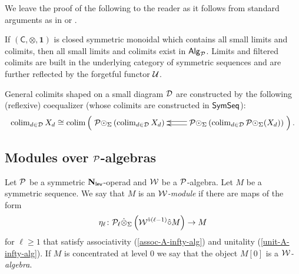 We leave the proof of the following to the reader as it follows from standard arguments as in \cite[3.29]{Har-1} or \cite[4.3]{Bor}.

\begin{proposition} If $(\mathsf{C},\otimes,\mathbf{1})$ is closed symmetric monoidal which contains all small limits and colimits, then all small limits and colimits exist in ${\mathsf{Alg}_{\mathcal{P}}}$. Limits and filtered colimits are built in the underlying category of symmetric sequences and are further reflected by the forgetful functor $\mathcal{U}$.

General colimits shaped on a small diagram $\mathcal{D}$ are constructed by the following (reflexive) coequalizer (whose colimits are constructed in $\mathsf{SymSeq}$): \[ \colim_{d\in\Cal{D}} X_d\cong \colim\left( \xymatrix{
     \Cal{P}\circdot_{\Sigma} \left( \colim_{d\in\Cal{D}} X_d \right) &
     \Cal{P}\circdot_{\Sigma} \left( \colim_{d\in\Cal{D}} \Cal{P}\circdot_{\Sigma}(X_d)\right) \ar@<.5ex>[l] \ar@<-.5ex>[l] 
    } \right).\]
\end{proposition}

\subsection{Modules over $\mathcal{P}$-algebras}

\begin{definition} \label{A-infty-alg} 
     Let $\mathcal{P}$ be a symmetric $\mathbf{N}_{\mathsf{lev}}$-operad and $\mathcal{W}$ be a $\mathcal{P}$-algebra. Let $M$ be a symmetric sequence. We say that $M$ is an \textit{$\mathcal{W}$-module} if there are maps of the form \[\eta_{\ell}\colon \mathcal{P}_{\ell} \dot{\otimes}_{\Sigma}  \left( \mathcal{W}^{\hat{\circ} (\ell-1)} \hat{\circ} M\right)\to M\] for $\ell\geq 1$ that satisfy associativity (\ref{assoc-A-infty-alg}) and unitality (\ref{unit-A-infty-alg}). If $M$ is concentrated at level $0$ we say that the object $M[0]$ is a \textit{$\mathcal{W}$-algebra}. 
\end{definition}

